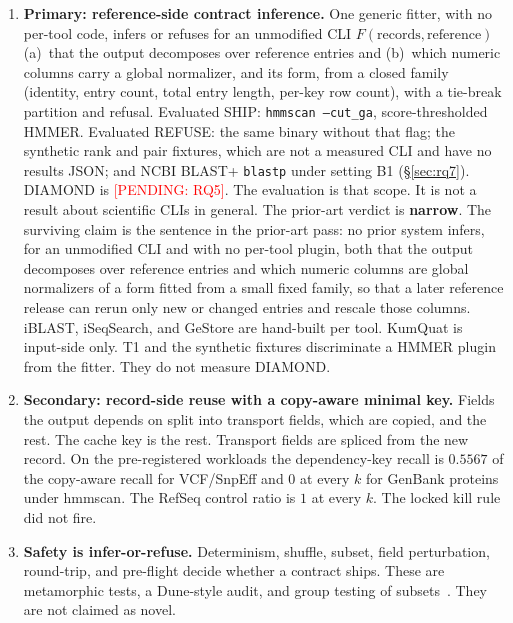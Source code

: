 \documentclass[letterpaper,twocolumn,10pt]{article}
\newcommand{\pending}[1]{\textcolor{red}{[PENDING: #1]}}
\begin{document}
\begin{enumerate}
  \item \textbf{Primary: reference-side contract inference.}
  One generic fitter, with no per-tool code, infers or refuses for an unmodified CLI $F(\mathrm{records},\mathrm{reference})$
  (a)~that the output decomposes over reference entries and
  (b)~which numeric columns carry a global normalizer, and its form, from a closed family (identity, entry count, total entry length, per-key row count), with a tie-break partition and refusal.
  Evaluated SHIP: \texttt{hmmscan --cut\_ga}, score-thresholded HMMER.
  Evaluated REFUSE: the same binary without that flag; the synthetic rank and pair fixtures, which are not a measured CLI and have no results JSON; and NCBI BLAST+ \texttt{blastp} under setting B1 (\S\ref{sec:rq7}).
  DIAMOND is
  \pending{RQ5}.
  The evaluation is that scope.
  It is not a result about scientific CLIs in general.
  The prior-art verdict is \textbf{narrow}.
  The surviving claim is the sentence in the prior-art pass: no prior system infers, for an unmodified CLI and with no per-tool plugin, both that the output decomposes over reference entries and which numeric columns are global normalizers of a form fitted from a small fixed family, so that a later reference release can rerun only new or changed entries and rescale those columns.
  iBLAST, iSeqSearch, and GeStore are hand-built per tool.
  KumQuat is input-side only.
  T1 and the synthetic fixtures discriminate a HMMER plugin from the fitter.
  They do not measure DIAMOND.
  \item \textbf{Secondary: record-side reuse with a copy-aware minimal key.}
  Fields the output depends on split into transport fields, which are copied, and the rest.
  The cache key is the rest.
  Transport fields are spliced from the new record.
  On the pre-registered workloads the dependency-key recall is
  $0.5567$
  of the copy-aware recall for VCF/SnpEff and
  $0$
  at every $k$ for GenBank proteins under hmmscan.
  The RefSeq control ratio is
  $1$
  at every $k$.
  The locked kill rule did not fire.
  \item \textbf{Safety is infer-or-refuse.}
  Determinism, shuffle, subset, field perturbation, round-trip, and pre-flight decide whether a contract ships.
  These are metamorphic tests, a Dune-style audit, and group testing of subsets~\cite{chen1998metamorphic,segura2016survey,dune-cache-check}.
  They are not claimed as novel.
\end{enumerate}
\end{document}
